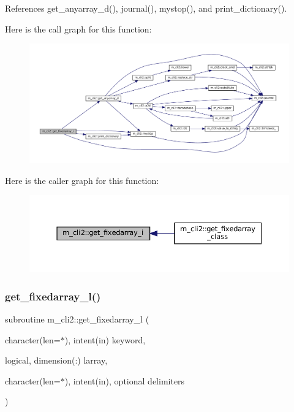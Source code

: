 References get\+\_\+anyarray\+\_\+d(), journal(), mystop(), and print\+\_\+dictionary().

Here is the call graph for this function\+:
\nopagebreak
\begin{figure}[H]
\begin{center}
\leavevmode
\includegraphics[width=350pt]{namespacem__cli2_aa469ba94e6bb122c9bf30dd8642b693b_cgraph}
\end{center}
\end{figure}
Here is the caller graph for this function\+:\nopagebreak
\begin{figure}[H]
\begin{center}
\leavevmode
\includegraphics[width=350pt]{namespacem__cli2_aa469ba94e6bb122c9bf30dd8642b693b_icgraph}
\end{center}
\end{figure}
\mbox{\label{namespacem__cli2_a65ffe8c7a444db5db3be3f6edecef008}} 
\subsubsection{\texorpdfstring{get\+\_\+fixedarray\+\_\+l()}{get\_fixedarray\_l()}}
{\footnotesize\ttfamily subroutine m\+\_\+cli2\+::get\+\_\+fixedarray\+\_\+l (\begin{DoxyParamCaption}\item[{character(len=$\ast$), intent(in)}]{keyword,  }\item[{logical, dimension(\+:)}]{larray,  }\item[{character(len=$\ast$), intent(in), optional}]{delimiters }\end{DoxyParamCaption})\hspace{0.3cm}{\ttfamily [private]}}



